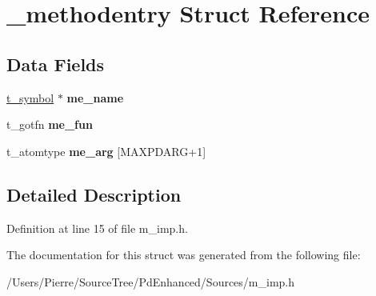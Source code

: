 \hypertarget{struct__methodentry}{\section{\-\_\-methodentry Struct Reference}
\label{struct__methodentry}
}
\subsection*{Data Fields}
\begin{DoxyCompactItemize}
\item 
\hypertarget{struct__methodentry_a7d8da37eb761c45584083c04e1be7835}{\hyperlink{struct__symbol}{t\-\_\-symbol} $\ast$ {\bfseries me\-\_\-name}}\label{struct__methodentry_a7d8da37eb761c45584083c04e1be7835}

\item 
\hypertarget{struct__methodentry_a726653dbfce8c0c105b85bd296868317}{t\-\_\-gotfn {\bfseries me\-\_\-fun}}\label{struct__methodentry_a726653dbfce8c0c105b85bd296868317}

\item 
\hypertarget{struct__methodentry_ad0776696276cabf71df0936374394436}{t\-\_\-atomtype {\bfseries me\-\_\-arg} \mbox{[}M\-A\-X\-P\-D\-A\-R\-G+1\mbox{]}}\label{struct__methodentry_ad0776696276cabf71df0936374394436}

\end{DoxyCompactItemize}


\subsection{Detailed Description}


Definition at line 15 of file m\-\_\-imp.\-h.



The documentation for this struct was generated from the following file\-:\begin{DoxyCompactItemize}
\item 
/\-Users/\-Pierre/\-Source\-Tree/\-Pd\-Enhanced/\-Sources/m\-\_\-imp.\-h\end{DoxyCompactItemize}
